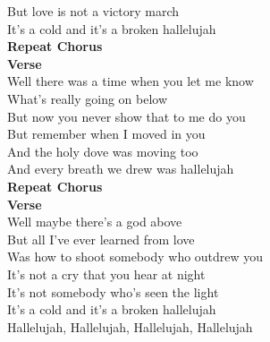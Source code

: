 But love is not a victory march\\
It's a cold and it's a broken hallelujah\\
\textbf{Repeat Chorus}\\
\textbf{Verse}\\
Well there was a time when you let me know \\
What's really going on below\\
But now you never show that to me do you \\
But remember when I moved in you\\
And the holy dove was moving too\\
And every breath we drew was hallelujah\\
\textbf{Repeat Chorus}\\
\textbf{Verse}\\
Well maybe there's a god above \\
But all I've ever learned from love\\
Was how to shoot somebody who outdrew you \\
It's not a cry that you hear at night\\
It's not somebody who's seen the light\\
It's a cold and it's a broken hallelujah\\
Hallelujah, Hallelujah, Hallelujah, Hallelujah 
